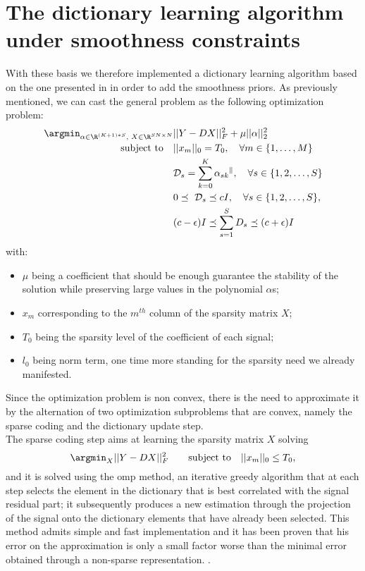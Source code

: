 \section{The dictionary learning algorithm under smoothness constraints}
With these basis we therefore implemented a dictionary learning algorithm based on the one presented in \cite{Thanou2014} in order to add the smoothness priors. As previously mentioned, we can cast the general problem as the following optimization problem:
\begin{align}
  \argmin_{\small{\alpha \in \R^{(K+1)*S}, \text{ } X \in \R^{SN \times N}}} &||Y-DX||^2_F + \mu ||\alpha||_2^2 \label{eq:objDictionary}\\
  \text{subject to} \quad &||x_m||_0 = T_0, \quad \forall m \in \{1,\dots,M\} \notag \\
  &\mathcal{D}_s = \sum_{k=0}^{K}\alpha_{sk}\mathcal{^k}, \quad \forall s \in \{1,2,\dots,S\} \notag \\
  &0 \preceq \text{ } \mathcal{D}_s \preceq cI, \quad \forall s \in \{1,2,\dots , S\},\notag \\
  &(c-\epsilon)I \preceq \sum_{s=1}^{S}D_s \preceq (c+\epsilon)I \notag
\end{align}
with:
\begin{itemize}
\item $\mu$ being a coefficient that should be enough guarantee the stability of the solution while preserving large values in the polynomial $\alpha$s;
\item $x_m$ corresponding to the $m^{th}$ column of the sparsity matrix $X$;
\item $T_0$ being the sparsity level of the coefficient of each signal;
\item $l_0$ being norm term, one time more standing for the sparsity need we already manifested.
\end{itemize}

Since the optimization problem is non convex, there is the need to approximate it by the alternation of two optimization subproblems that are convex, namely the sparse coding and the dictionary update step.\\

The sparse coding step aims at learning the sparsity matrix $X$ solving
\begin{equation}
  \argmin_{X} ||Y - DX||^2_F \qquad \text{subject to} \quad ||x_m||_0 \leq T_0,
\end{equation}
and it is solved using the \gls{omp} method, an iterative greedy algorithm that at each step selects the element in the dictionary that is best correlated with the signal residual part; it subsequently produces a new estimation through the projection of the signal onto the dictionary elements that have already been selected. This method admits simple and fast implementation and it has been proven that his error on the approximation is only a small factor worse than the minimal error obtained through a non-sparse representation. \cite{Tropp2004}.\\

